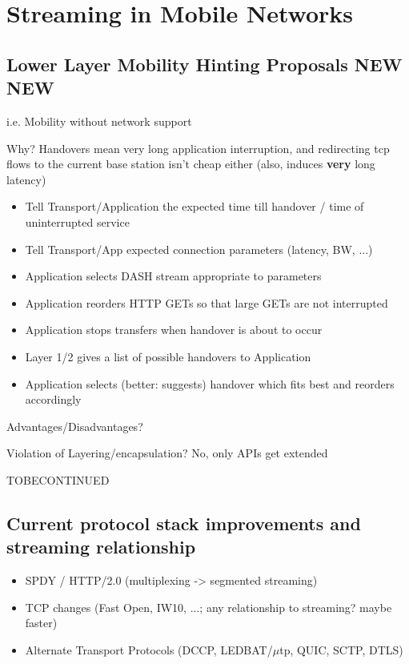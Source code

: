 \chapter{Streaming in Mobile Networks}


\section{Lower Layer Mobility Hinting Proposals NEW NEW}

i.e. Mobility without network support

Why? Handovers mean very long application interruption, and redirecting tcp flows to the current base station isn't cheap either (also, induces \textbf{very} long latency)

\begin{itemize}
\item Tell Transport/Application the expected time till handover / time of uninterrupted service
\item Tell Transport/App expected connection parameters (latency, BW, ...)
\item Application selects DASH stream appropriate to parameters
\item Application reorders HTTP GETs so that large GETs are not interrupted
\item Application stops transfers when handover is about to occur
\item Layer 1/2 gives a list of possible handovers to Application
\item Application selects (better: suggests) handover which fits best and reorders accordingly
\end{itemize}

Advantages/Disadvantages?

Violation of Layering/encapsulation? No, only APIs get extended 

TOBECONTINUED



\section{Current protocol stack improvements and streaming relationship}

\begin{itemize}
\item SPDY / HTTP/2.0 (multiplexing -> segmented streaming)
\item TCP changes (Fast Open, IW10, ...; any relationship to streaming? maybe faster)
\item Alternate Transport Protocols (DCCP, LEDBAT/$\mu$tp, QUIC, SCTP, DTLS)
\end{itemize}



